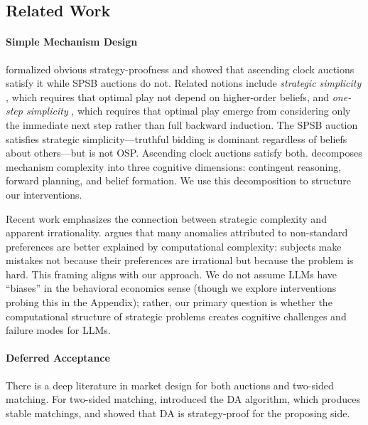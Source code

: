 \documentclass[format=acmsmall, review=false]{acmart}
\begin{document}
\subsection{Related Work} \label{sec:related}

\paragraph{Simple Mechanism Design}

 \citet{li2017obviously} formalized obvious strategy-proofness and showed that ascending clock auctions satisfy it while  SPSB auctions do not. Related notions include \textit{strategic simplicity} \citep{borgers2019strategically}, which requires that optimal play not depend on higher-order beliefs, and \textit{one-step simplicity} \citep{pycia2023theory}, which requires that optimal play emerge from considering only the immediate next step rather than full backward induction. The SPSB auction satisfies strategic simplicity---truthful bidding is dominant regardless of beliefs about others---but is not OSP. Ascending clock auctions satisfy both. \citet{li2024designing} decomposes mechanism complexity into three cognitive dimensions: contingent reasoning, forward planning, and belief formation. We use this decomposition to structure our interventions.

Recent work emphasizes the connection between strategic complexity and apparent irrationality. \citet{oprea2024decisions} argues that many anomalies attributed to non-standard preferences are better explained by computational complexity: subjects make mistakes not because their preferences are irrational but because the problem is hard. This framing aligns with our approach. We do not assume LLMs have ``biases'' in the behavioral economics sense (though we explore interventions probing this in the Appendix); rather, our primary question is whether the computational structure of strategic problems creates cognitive challenges and failure modes for LLMs.

\paragraph{Deferred Acceptance}

There is a deep literature in market design for both auctions and two-sided matching. %
For two-sided matching, \citet{gale1962college} introduced the DA algorithm, which produces stable matchings, and \citet{roth1982economics} showed that DA is strategy-proof for the proposing side.
\end{document}

